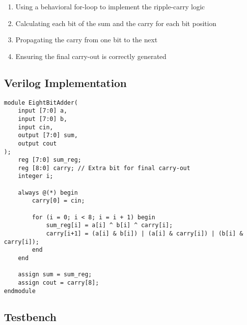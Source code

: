 \documentclass{article}
\begin{document}
\begin{enumerate}
	\item Using a behavioral for-loop to implement the ripple-carry logic
	\item Calculating each bit of the sum and the carry for each bit position
	\item Propagating the carry from one bit to the next
	\item Ensuring the final carry-out is correctly generated
\end{enumerate}

\subsection{Verilog Implementation}

\begin{lstlisting}
module EightBitAdder(
    input [7:0] a,
    input [7:0] b,
    input cin,
    output [7:0] sum,
    output cout
);
    reg [7:0] sum_reg;
    reg [8:0] carry; // Extra bit for final carry-out
    integer i;
    
    always @(*) begin
        carry[0] = cin;
        
        for (i = 0; i < 8; i = i + 1) begin
            sum_reg[i] = a[i] ^ b[i] ^ carry[i];
            carry[i+1] = (a[i] & b[i]) | (a[i] & carry[i]) | (b[i] & carry[i]);
        end
    end
    
    assign sum = sum_reg;
    assign cout = carry[8];
endmodule
\end{lstlisting}

\subsection{Testbench}
\end{document}
